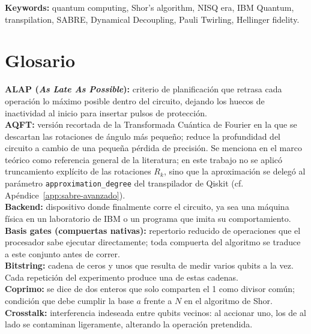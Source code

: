 \documentclass[12pt, spanish]{book}
\begin{document}
\noindent\textbf{Keywords:} quantum computing, Shor's algorithm, NISQ era, IBM Quantum, transpilation, SABRE, Dynamical Decoupling, Pauli Twirling, Hellinger fidelity.

\chapter*{Glosario}

\textbf{ALAP (\textit{As Late As Possible}):} criterio de planificación que retrasa cada operación lo máximo posible dentro del circuito, dejando los huecos de inactividad al inicio para insertar pulsos de protección.\\

\textbf{AQFT:} versión recortada de la Transformada Cuántica de Fourier en la que se descartan las rotaciones de ángulo más pequeño; reduce la profundidad del circuito a cambio de una pequeña pérdida de precisión. Se menciona en el marco teórico como referencia general de la literatura; en este trabajo no se aplicó truncamiento explícito de las rotaciones $R_k$, sino que la aproximación se delegó al parámetro \texttt{approximation\_degree} del transpilador de Qiskit (cf. Apéndice~\ref{app:sabre-avanzado}).\\

\textbf{Backend:} dispositivo donde finalmente corre el circuito, ya sea una máquina física en un laboratorio de IBM o un programa que imita su comportamiento.\\

\textbf{Basis gates (compuertas nativas):} repertorio reducido de operaciones que el procesador sabe ejecutar directamente; toda compuerta del algoritmo se traduce a este conjunto antes de correr.\\

\textbf{Bitstring:} cadena de ceros y unos que resulta de medir varios qubits a la vez. Cada repetición del experimento produce una de estas cadenas.\\

\textbf{Coprimo:} se dice de dos enteros que solo comparten el 1 como divisor común; condición que debe cumplir la base \(a\) frente a \(N\) en el algoritmo de Shor.\\

\textbf{Crosstalk:} interferencia indeseada entre qubits vecinos: al accionar uno, los de al lado se contaminan ligeramente, alterando la operación pretendida.\\
\end{document}
